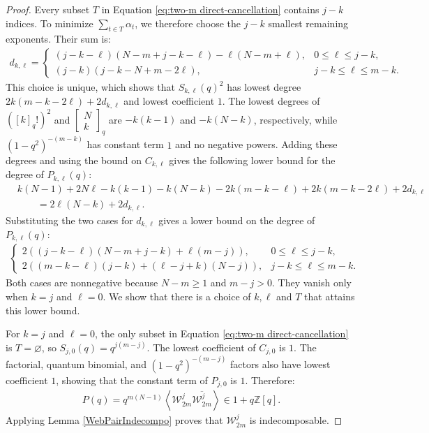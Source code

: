 \documentclass[12pt]{amsart}
\theoremstyle{definition}
\theoremstyle{remark}
\numberwithin{equation}{section}
\numberwithin{figure}{section}
\newcommand{\Z}{\mathbb{Z}}
\begin{document}
\begin{proof}
Every subset $T$ in Equation \eqref{eq:two-m direct-cancellation} contains $j-k$ indices. To minimize $\sum_{t \in T}\alpha_t$, we therefore choose the $j-k$ smallest remaining exponents. Their sum is:
\begin{align*}
    d_{k,\ell} = \begin{cases}
        (j-k-\ell)(N-m+j-k-\ell)-\ell(N-m+\ell), & 0 \leq \ell \leq j-k, \\
        (j-k)(j-k-N+m-2\ell), & j-k \leq \ell \leq m-k.
    \end{cases}
\end{align*}
This choice is unique, which shows that $S_{k,\ell}(q)^2$ has lowest degree $2k(m-k-2\ell)+2d_{k,\ell}$ and lowest coefficient $1$.
The lowest degrees of $([k]_q!)^2$ and $\begin{bmatrix}N\\k\end{bmatrix}_q$ are $-k(k-1)$ and $-k(N-k)$, respectively, while $(1-q^2)^{-(m-k)}$ has constant term $1$ and no negative powers. Adding these degrees and using the bound on $C_{k,\ell}$ gives the following lower bound for the degree of $P_{k,\ell}(q)$:
\begin{align*}
    &k(N-1)+2N\ell-k(k-1)-k(N-k)-2k(m-k-\ell)+2k(m-k-2\ell)+2d_{k,\ell} \\
    &\qquad = 2\ell(N-k)+2d_{k,\ell}.
\end{align*}
Substituting the two cases for $d_{k,\ell}$ gives a lower bound on the degree of $P_{k,\ell}(q)$:
\begin{align}\label{eq:two-m direct-degree-bound}
    \begin{cases}
        2\left((j-k-\ell)(N-m+j-k)+\ell(m-j)\right), & 0 \leq \ell \leq j-k, \\
        2\left((m-k-\ell)(j-k)+(\ell-j+k)(N-j)\right), & j-k \leq \ell \leq m-k.
    \end{cases}
\end{align}
Both cases are nonnegative because $N-m \geq 1$ and $m-j > 0$. They vanish only when $k = j$ and $\ell = 0$. We show that there is a choice of $k, \ell$ and $T$ that attains this lower bound.

For $k = j$ and $\ell = 0$, the only subset in Equation \eqref{eq:two-m direct-cancellation} is $T = \varnothing$, so $S_{j,0}(q) = q^{j(m-j)}$. The lowest coefficient of $C_{j,0}$ is $1$. The factorial, quantum binomial, and $(1-q^2)^{-(m-j)}$ factors also have lowest coefficient $1$, showing that the constant term of $P_{j,0}$ is $1$. Therefore:
\begin{align*}
    P(q)= q^{m(N-1)}\left\langle \mathcal{W}^j_{2m}\overline{\mathcal{W}^j_{2m}} \right\rangle \in 1 + q\Z[q].
\end{align*}
Applying Lemma \ref{WebPairIndecompo} proves that $\mathcal{W}^j_{2m}$ is indecomposable.
\end{proof}
\end{document}
